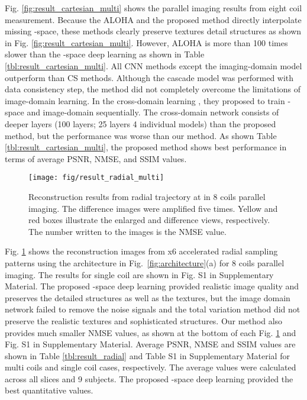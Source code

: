 \documentclass[10pt,journal]{IEEEtran}
\newcommand{\0}{{\boldsymbol{0}}}
\begin{document}
 Fig. \ref{fig:result_cartesian_multi} shows the parallel imaging results from  eight coil measurement. 
Because the ALOHA \cite{jin2016general} and the proposed method directly interpolate missing -space, these methods clearly preserve textures detail structures as shown in  Fig. \ref{fig:result_cartesian_multi}. However, ALOHA \cite{jin2016general} is more than 100 times slower than the -space deep learning as shown in Table \ref{tbl:result_cartesian_multi}.  
All CNN methods except the imaging-domain model outperform than CS methods. Although the cascade model \cite{schlemper2018deep} was performed with data consistency step, the method did not completely
overcome the limitations of image-domain learning. In the cross-domain learning \cite{eo2018kiki}, they proposed to train -space and image-domain sequentially. 
The cross-domain network consists of deeper layers (100 layers; 25 layers  4 individual models) than the proposed method, 
but the performance was worse than our method. As shown Table \ref{tbl:result_cartesian_multi},
the proposed method shows best performance in terms of average PSNR, NMSE, and SSIM values.


 
\begin{figure}[!t] 	
\centering
\centerline{\texttt{[image: fig/result\_radial\_multi]}}
\caption{Reconstruction results from radial trajectory at  in 8 coils parallel imaging. The difference images were amplified five times. Yellow and red boxes illustrate the enlarged and difference views, respectively.  The number written to the images is the NMSE value.}
\label{fig:result_radial}
\end{figure}
 
 

Fig. \ref{fig:result_radial} shows the reconstruction images from x6 accelerated radial sampling patterns using the architecture in Fig.~\ref{fig:architecture}(a) for 8 coils parallel imaging. The results for single coil are shown in Fig. S1 in Supplementary Material. 
The proposed -space deep learning provided realistic image quality and preserves the detailed structures as well as the textures, but the image domain network failed to remove the noise signals and the total variation method did not preserve the realistic textures and sophisticated structures. Our method also provides much smaller NMSE values, as shown at the bottom of each Fig. \ref{fig:result_radial}  and Fig. S1 in Supplementary Material. Average PSNR, NMSE and SSIM values are shown in Table \ref{tbl:result_radial} and Table S1 in Supplementary Material for multi coils and single coil cases, respectively. The average values were calculated across all slices and 9 subjects. The proposed -space deep learning provided the best quantitative values. 
\end{document}
